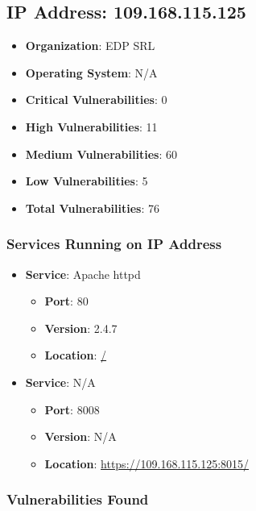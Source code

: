\documentclass{article}
\begin{document}
\clearpage



\subsection*{IP Address: 109.168.115.125}

\begin{itemize}
    \item \textbf{Organization}: EDP SRL
    \item \textbf{Operating System}:  N/A 
    \item \textbf{Critical Vulnerabilities}: 0
    \item \textbf{High Vulnerabilities}: 11
    \item \textbf{Medium Vulnerabilities}: 60
    \item \textbf{Low Vulnerabilities}: 5
    \item \textbf{Total Vulnerabilities}: 76
\end{itemize}

\subsubsection*{Services Running on IP Address}

\begin{itemize}
    
        \item \textbf{Service}: Apache httpd
        \begin{itemize}
            \item \textbf{Port}: 80
            \item \textbf{Version}:  2.4.7 
            \item \textbf{Location}: \href{ / }{ / }
        \end{itemize}
    
        \item \textbf{Service}: N/A
        \begin{itemize}
            \item \textbf{Port}: 8008
            \item \textbf{Version}:  N/A 
            \item \textbf{Location}: \href{ https://109.168.115.125:8015/ }{ https://109.168.115.125:8015/ }
        \end{itemize}
    
\end{itemize}


\subsubsection*{Vulnerabilities Found}
\end{document}
